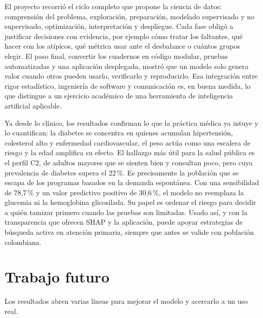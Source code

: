 \documentclass[conference,a4paper]{IEEEtran}
\begin{document}
El proyecto recorrió el ciclo completo que propone la ciencia de datos: comprensión del problema, exploración, preparación, modelado supervisado y no supervisado, optimización, interpretación y despliegue. Cada fase obligó a justificar decisiones con evidencia, por ejemplo cómo tratar los faltantes, qué hacer con los atípicos, qué métrica usar ante el desbalance o cuántos grupos elegir. El paso final, convertir los cuadernos en código modular, pruebas automatizadas y una aplicación desplegada, mostró que un modelo solo genera valor cuando otros pueden usarlo, verificarlo y reproducirlo. Esa integración entre rigor estadístico, ingeniería de software y comunicación es, en buena medida, lo que distingue a un ejercicio académico de una herramienta de inteligencia artificial aplicable.

Ya desde lo clínico,  los resultados confirman lo que la práctica médica ya intuye y lo cuantifican: la diabetes se concentra en quienes acumulan hipertensión, colesterol alto y enfermedad cardiovascular, el peso actúa como una escalera de riesgo y la edad amplifica su efecto. El hallazgo más útil para la salud pública es el perfil C2, de adultos mayores que se sienten bien y consultan poco, pero cuya prevalencia de diabetes supera el 22\,\%. Es precisamente la población que se escapa de los programas basados en la demanda espontánea. Con una sensibilidad de 78,7\,\% y un valor predictivo positivo de 30,6\,\%, el modelo no reemplaza la glucemia ni la hemoglobina glicosilada. Su papel es ordenar el riesgo para decidir a quién tamizar primero cuando las pruebas son limitadas. Usado así, y con la transparencia que ofrecen SHAP y la aplicación, puede apoyar estrategias de búsqueda activa en atención primaria, siempre que antes se valide con población colombiana.

\section{Trabajo futuro}
Los resultados abren varias líneas para mejorar el modelo y acercarlo a un uso real. 
\end{document}

